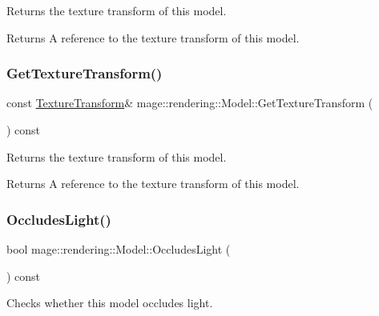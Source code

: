 Returns the texture transform of this model.

\begin{DoxyReturn}{Returns}
A reference to the texture transform of this model. 
\end{DoxyReturn}
\hypertarget{classmage_1_1rendering_1_1_model_adc18923fdb300d1eb753c9dcb9d30677}{}\label{classmage_1_1rendering_1_1_model_adc18923fdb300d1eb753c9dcb9d30677} 
\subsubsection{\texorpdfstring{Get\+Texture\+Transform()}{GetTextureTransform()}\hspace{0.1cm}{\footnotesize\ttfamily [2/2]}}
{\footnotesize\ttfamily const \hyperlink{classmage_1_1_texture_transform}{Texture\+Transform}\& mage\+::rendering\+::\+Model\+::\+Get\+Texture\+Transform (\begin{DoxyParamCaption}{ }\end{DoxyParamCaption}) const\hspace{0.3cm}{\ttfamily [noexcept]}}

Returns the texture transform of this model.

\begin{DoxyReturn}{Returns}
A reference to the texture transform of this model. 
\end{DoxyReturn}
\hypertarget{classmage_1_1rendering_1_1_model_ac6238580ce9572b9274bf21852f73455}{}\label{classmage_1_1rendering_1_1_model_ac6238580ce9572b9274bf21852f73455} 
\subsubsection{\texorpdfstring{Occludes\+Light()}{OccludesLight()}}
{\footnotesize\ttfamily bool mage\+::rendering\+::\+Model\+::\+Occludes\+Light (\begin{DoxyParamCaption}{ }\end{DoxyParamCaption}) const\hspace{0.3cm}{\ttfamily [noexcept]}}

Checks whether this model occludes light.

